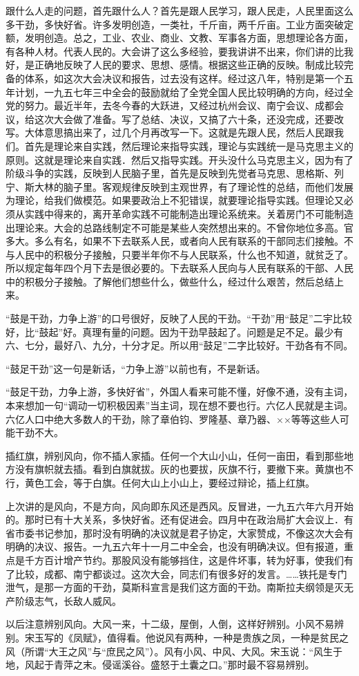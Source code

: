 跟什么人走的问题，首先跟什么人？首先是跟人民学习，跟人民走，人民里面这么多干劲，多快好省。许多发明创造，一类社，千斤亩，两千斤亩。工业方面突破定额，发明创造。总之，工业、农业、商业、文教、军事各方面，思想理论各方面，有各种人材。代表人民的。大会讲了这么多经验，要我讲讲不出来，你们讲的比我好，是正确地反映了人民的要求、思想、感情。根据这些正确的反映。制成比较完备的体系，如这次大会决议和报告，过去没有这样。经过这八年，特别是第一个五年计划，一九五七年三中全会的鼓励就给了全党全国人民比较明确的方向，经过全党的努力。最近半年，去冬今春的大跃进，又经过杭州会议、南宁会议、成都会议，给这次大会做了准备。写了总结、决议，又搞了六十条，还没完成，还要改写。大体意思搞出来了，过几个月再改写一下。这就是先跟人民，然后人民跟我们。首先是理论来自实践，然后理论来指导实践，理论与实践统一是马克思主义的原则。这就是理论来自实践．然后又指导实践。开头没什么马克思主义，因为有了阶级斗争的实践，反映到人民脑子里，首先是反映到先觉者马克思、思格斯、列宁、斯大林的脑子里。客观规律反映到主观世界，有了理论性的总结，而他们发展为理论，给我们做模范。如果要政治上不犯错误，就要理论指导实践。但理论又必须从实践中得来的，离开革命实践不可能制造出理论系统来。关着房门不可能制造出理论来。大会的总路线制定不可能是某些人突然想出来的。不曾你地位多高。官多大。多么有名，如果不下去联系人民，或者向人民有联系的干部同志们接触。不与人民中的积极分子接触，只要半年你不与人民联系，什么也不知道，就贫乏了。所以规定每年四个月下去是很必要的。下去联系人民向与人民有联系的干部、人民中的积极分子接触。了解他们想些什么，做些什么，经过什么艰苦，然后总结上来。

“鼓是干劲，力争上游”的口号很好，反映了人民的干劲。“干劲”用“鼓足”二宇比较好，比“鼓起”好。真理有量的问题。因为干劲早鼓起了。问题是足不足。最少有六、七分，最好八、九分，十分才足。所以用“鼓足”二字比较好。干劲各有不同。

“鼓足干劲”这一句是新话，“力争上游”以前也有，不是新话。

“鼓足干劲，力争上游，多快好省”，外国人看来可能不懂，好像不通，没有主词，本来想加一句“调动一切积极因素”当主词，现在想不要也行。六亿人民就是主词。六亿人口中绝大多数人的干劲，除了章伯钧、罗隆基、章乃器、××等等这些人可能干劲不大。

插红旗，辨别风向，你不插人家插。任何一个大山小山，任何一亩田，看到那些地方没有旗帜就去插。看到白旗就拔。灰的也要拔，灰旗不行，要撤下来。黄旗也不行，黄色工会，等于白旗。任何大山上小山上，要经过辩论，插上红旗。

上次讲的是风向，不是方向，风向即东风还是西风。反冒进，一九五六年六月开始的。那时已有十大关系，多快好省。还有促进会。四月中在政治局扩大会议上．有省市委书记参加，那时没有明确的决议就是君子协定，大家赞成，不像这次大会有明确的决议、报告。一九五六年十一月二中全会，也没有明确决议。但有报道，重点是千方百计增产节约。那股风没有能够挡住，这是件坏事，转为好事，使我们有了比较，成都、南宁都谈过。这次大会，同志们有很多好的发言。……铁托是专门泄气，是那一方面的干劲，莫斯科宣言是我们这方面的干劲。南斯拉夫纲领是灭无产阶级志气，长敌人威风。

以后注意辨别风向。大风一来，十二级，屋倒，人倒，这样好辨别。小风不易辨别。宋玉写的《凤赋》，值得看。他说风有两种，一种是贵族之凤，一种是贫民之风（所谓“大王之风”与“庶民之风”）。风有小风、中风、大风。宋玉说：“风生于地，风起于青萍之末。侵谣溪谷。盛怒于土囊之口。”那时最不容易辨别。


